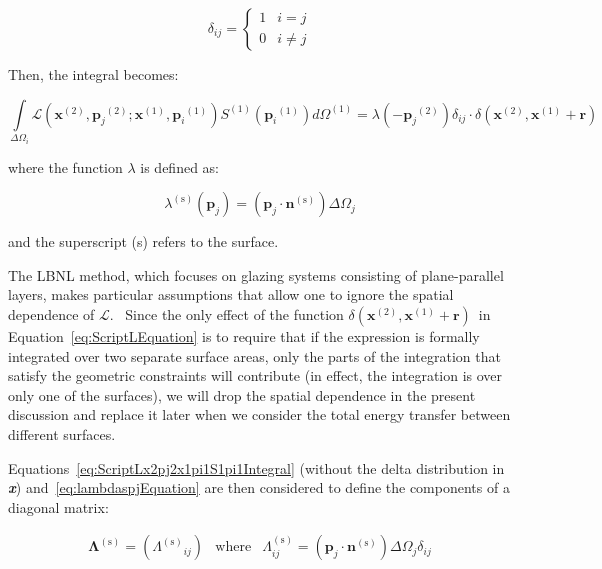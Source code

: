 \begin{equation}
{\delta_{ij}} = \left\{ {\begin{array}{ccc}1&{i = j}\\0&{i \ne j}\end{array}} \right.
\end{equation}

Then, the integral becomes:

\begin{equation}
\int\limits_{\Delta {\Omega_i}} {\mathcal{L}({{\mathbf{x}}^{{\mathrm{(2)}}}},{{\mathbf{p}}_j}^{{\mathrm{(2)}}};{{\mathbf{x}}^{{\mathrm{(1)}}}},{{\mathbf{p}}_i}^{{\mathrm{(1)}}}){S^{{\mathrm{(1)}}}}({{\mathbf{p}}_i}^{{\mathrm{(1)}}})d{\Omega ^{{\mathrm{(1)}}}}}  = \lambda ( - {{\mathbf{p}}_j}^{{\mathrm{(2)}}}){\delta_{ij}} \cdot \delta ({{\mathbf{x}}^{{\mathrm{(2)}}}},{{\mathbf{x}}^{{\mathrm{(1)}}}} + {\mathbf{r}})
\label{eq:ScriptLx2pj2x1pi1S1pi1Integral}
\end{equation}

where the function \(\lambda\) is defined as:

\begin{equation}
{\lambda ^{{\mathrm{(s)}}}}({{\mathbf{p}}_j}) = \left( {{{\mathbf{p}}_j}\cdot {{\mathbf{n}}^{{\mathrm{(s)}}}}} \right)\Delta {\Omega_j}
\label{eq:lambdaspjEquation}
\end{equation}

and the superscript (s) refers to the surface.

The LBNL method, which focuses on glazing systems consisting of plane-parallel layers, makes particular assumptions that allow one to ignore the spatial dependence of $\mathcal{L}$.~ Since the only effect of the function \(\delta ({{\mathbf{x}}^{{\mathrm{(2)}}}},{{\mathbf{x}}^{{\mathrm{(1)}}}} + {\mathbf{r}})\)~in Equation~\ref{eq:ScriptLEquation} is to require that if the expression is formally integrated over two separate surface areas, only the parts of the integration that satisfy the geometric constraints will contribute (in effect, the integration is over only one of the surfaces), we will drop the spatial dependence in the present discussion and replace it later when we consider the total energy transfer between different surfaces.

Equations~\ref{eq:ScriptLx2pj2x1pi1S1pi1Integral} (without the delta distribution in \textbf{\emph{x}}) and~\ref{eq:lambdaspjEquation} are then considered to define the components of a diagonal matrix:

\begin{equation}
\begin{array}{ccc}{{\boldsymbol{\Lambda}^{{\mathrm{(s)}}}} = \left( {{\Lambda ^{{\mathrm{(s)}}}}_{ij}} \right)}&{{\mathrm{where}}}&{\Lambda_{ij}^{{\mathrm{(s)}}} = \left( {{{\mathbf{p}}_j}\cdot {{\mathbf{n}}^{{\mathrm{(s)}}}}} \right)\Delta {\Omega_j}{\delta_{ij}}}\end{array}
\label{eq:LambdasEquation}
\end{equation}

